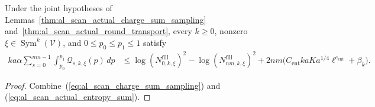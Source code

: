 \begin{lemma}
    \label{thm:al_scan_actual_charge_sum_bound}
    \leanok
    Under the joint hypotheses of
    Lemmas~\ref{thm:al_scan_actual_charge_sum_sampling}
    and~\ref{thm:al_scan_actual_round_transport}, every $k\ge0$, nonzero
    $\xi\in\operatorname{Sym}^k(\mathcal V)$, and $0\le p_0\le p_1\le1$ satisfy
    \begin{align}
        ka\alpha\sum_{s=0}^{nm-1}\int_{p_0}^{p_1}
        \mathcal Q_{s,k,\xi}(p)\,dp
         & \le \log (N^{\mathrm{fill}}_{0,k,\xi})^2
        -\log (N^{\mathrm{fill}}_{nm,k,\xi})^2
        +2nm\bigl(C_{\mathrm{ent}}kaKa^{1/4}\ell^{e_{\mathrm{ent}}}+\beta_k\bigr).
        \label{eq:al_scan_actual_charge_sum}
    \end{align}
\end{lemma}
\begin{proof}\leanok
    Combine~(\ref{eq:al_scan_charge_sum_sampling}) and
    (\ref{eq:al_scan_actual_entropy_sum}).
\end{proof}

